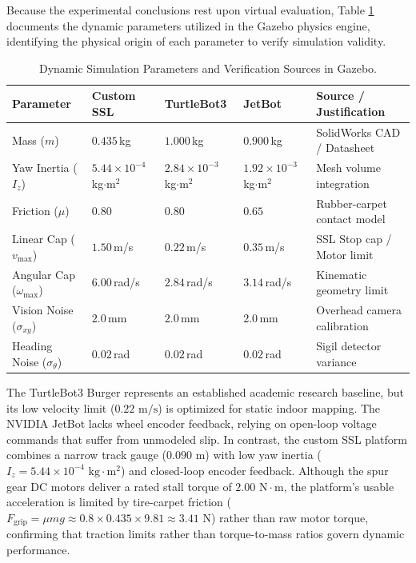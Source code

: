 \documentclass[a4paper,twoside,12pt]{report}
\begin{document}
Because the experimental conclusions rest upon virtual evaluation, Table \ref{tab:simulation_parameters} documents the dynamic parameters utilized in the Gazebo physics engine, identifying the physical origin of each parameter to verify simulation validity.

\begin{table}[H]
\centering
\small
\caption{Dynamic Simulation Parameters and Verification Sources in Gazebo.}
\label{tab:simulation_parameters}
\begin{tabularx}{\textwidth}{p{3.2cm}XXXp{3.2cm}}
\toprule
\textbf{Parameter} & \textbf{Custom SSL} & \textbf{TurtleBot3} & \textbf{JetBot} & \textbf{Source / Justification} \\
\midrule
Mass ($m$) & $0.435$\,kg & $1.000$\,kg & $0.900$\,kg & SolidWorks CAD / Datasheet \\
Yaw Inertia ($I_z$) & $5.44 \times 10^{-4}$\,kg$\cdot\text{m}^2$ & $2.84 \times 10^{-3}$\,kg$\cdot\text{m}^2$ & $1.92 \times 10^{-3}$\,kg$\cdot\text{m}^2$ & Mesh volume integration \\
Friction ($\mu$) & $0.80$ & $0.80$ & $0.65$ & Rubber-carpet contact model \\
Linear Cap ($v_{\text{max}}$) & $1.50$\,m/s & $0.22$\,m/s & $0.35$\,m/s & SSL Stop cap / Motor limit \\
Angular Cap ($\omega_{\text{max}}$) & $6.00$\,rad/s & $2.84$\,rad/s & $3.14$\,rad/s & Kinematic geometry limit \\
Vision Noise ($\sigma_{xy}$) & $2.0$\,mm & $2.0$\,mm & $2.0$\,mm & Overhead camera calibration \\
Heading Noise ($\sigma_\theta$) & $0.02$\,rad & $0.02$\,rad & $0.02$\,rad & Sigil detector variance \\
\bottomrule
\end{tabularx}
\end{table}

The TurtleBot3 Burger represents an established academic research baseline, but its low velocity limit ($0.22\text{ m/s}$) is optimized for static indoor mapping. The NVIDIA JetBot lacks wheel encoder feedback, relying on open-loop voltage commands that suffer from unmodeled slip. In contrast, the custom SSL platform combines a narrow track gauge ($0.090\text{ m}$) with low yaw inertia ($I_z = 5.44 \times 10^{-4}\text{ kg}\cdot\text{m}^2$) and closed-loop encoder feedback. Although the spur gear DC motors deliver a rated stall torque of $2.00\text{ N}\cdot\text{m}$, the platform's usable acceleration is limited by tire-carpet friction ($F_{\text{grip}} = \mu mg \approx 0.8 \times 0.435 \times 9.81 \approx 3.41\text{ N}$) rather than raw motor torque, confirming that traction limits rather than torque-to-mass ratios govern dynamic performance.
\end{document}
